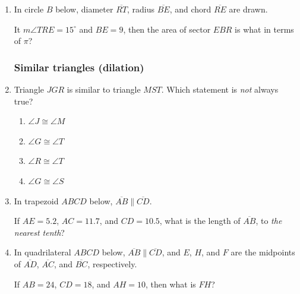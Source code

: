 \documentclass[12pt, oneside]{article}
\begin{document}
\begin{enumerate}[itemsep=0cm]
\item In circle $B$ below, diameter $\overline{RT}$, radius $\overline{BE}$, and chord $\overline{RE}$ are drawn.
\begin{center}
  \end{center}
  It $m\angle TRE = 15^\circ$ and $BE=9$, then the area of sector $EBR$ is what in terms of $\pi$?

\newpage
\subsubsection*{Similar triangles (dilation)}
\item Triangle $JGR$ is similar to triangle $MST$. Which statement is \emph{not}
always true?
\begin{multicols}{2}
  \begin{enumerate}
    \item $\angle J \cong \angle M$
    \item $\angle G \cong \angle T$ 
    \item $\angle R \cong \angle T$
    \item $\angle G \cong \angle S$
  \end{enumerate}
\end{multicols}

\item In trapezoid $ABCD$ below, $\overline{AB} \parallel \overline{CD}$.
\begin{center}
  \end{center}
If $AE=5.2$, $AC=11.7$, and $CD=10.5$, what is the length of $\overline{AB}$, to \emph{the nearest tenth}?

\item In quadrilateral $ABCD$ below, $\overline{AB} \parallel \overline{CD}$, and $E$, $H$, and $F$ are the midpoints of $\overline{AD}$, $\overline{AC}$,  and $\overline{BC}$, respectively.
\begin{center}
  \end{center}
If $AB=24$, $CD=18$, and $AH=10$, then what is $FH$?


\end{enumerate}
\end{document}
